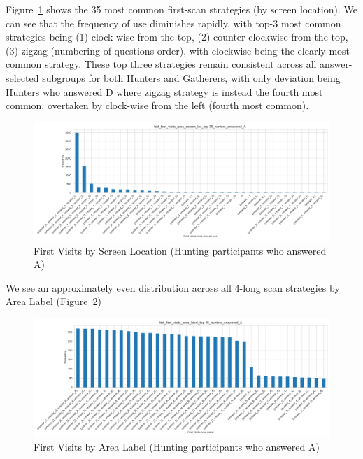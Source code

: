 \documentclass[manuscript,review,anonymous]{acmart}
\begin{document}
        Figure~\ref{fig:A_hunt_frst_loc} shows the 35 most common first-scan strategies (by screen location). We can see that the frequency of use diminishes rapidly, with top-3 most common strategies being (1) clock-wise from the top, (2) counter-clockwise from the top, (3) zigzag (numbering of questions order), with clockwise being the clearly most common strategy. These top three strategies remain consistent across all answer-selected subgroups for both Hunters and Gatherers, with only deviation being Hunters who answered D where zigzag strategy is instead the fourth most common, overtaken by clock-wise from the left (fourth most common). 

        \begin{figure}[htbp]
            \centering
            \includegraphics[width=1\linewidth]{plots/visits_hists/hist_first_visits_area_screen_loc_top-35_hunters_answered_A.png}
            \caption{First Visits by Screen Location (Hunting participants who answered A)}
            \label{fig:A_hunt_frst_loc}
        \end{figure}

        We see an approximately even distribution across all 4-long scan strategies by Area Label (Figure~\ref{fig:A_hunt_frst_lbl})

        \begin{figure}[htbp]
            \centering
            \includegraphics[width=1\linewidth]{plots/visits_hists/hist_first_visits_area_label_top-35_hunters_answered_A.png}
            \caption{First Visits by Area Label (Hunting participants who answered A)}
            \label{fig:A_hunt_frst_lbl}
        \end{figure}
        
\end{document}
